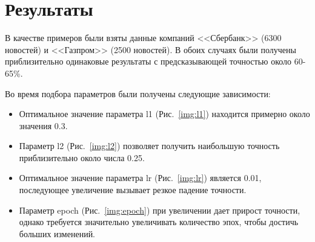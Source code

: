 \documentclass[14pt]{matmex-diploma-custom}
\begin{document}
\clearpage\section{Результаты}

В качестве примеров были взяты данные компаний <<Сбербанк>> (6300 новостей) и <<Газпром>> (2500 новостей). В обоих случаях были получены приблизительно одинаковые результаты с предсказывающей точностью около 60-65\%.

Во время подбора параметров были получены следующие зависимости:

\begin{itemize}
\item Оптимальное значение параметра l1 (Рис.~\ref{img:l1}) находится примерно около значения 0.3.
\item Параметр l2 (Рис.~\ref{img:l2}) позволяет получить наибольшую точность приблизительно около числа 0.25.
\item Оптимальное значение параметра lr (Рис.~\ref{img:lr}) является 0.01, последующее увеличение вызывает резкое падение точности.
\item Параметр epoch (Рис.~\ref{img:epoch}) при увеличении дает прирост точности, однако требуется значительно увеличивать количество эпох, чтобы достичь больших изменений.
\end{itemize}
\end{document}
